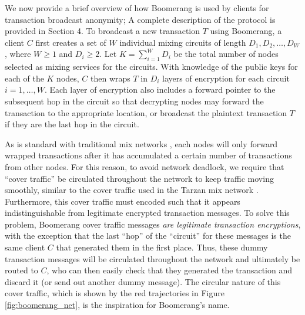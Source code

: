 We now provide a brief overview of how Boomerang is used by clients for transaction broadcast anonymity; A complete description of the protocol is provided in Section 4. To broadcast a new transaction $T$ using Boomerang, a client $C$ first creates a set of $W$ individual mixing circuits of length $D_1,D_2,\dots,D_W$, where $W \geq 1$ and $D_i \geq 2$. Let $K = \sum_{i=1}^WD_i$ be the total number of nodes selected as mixing services for the circuits. With knowledge of the public keys for each of the $K$ nodes, $C$ then wraps $T$ in $D_i$ layers of encryption for each circuit $i = 1,\dots,W$. Each layer of encryption also includes a forward pointer to the subsequent hop in the circuit so that decrypting nodes may forward the transaction to the appropriate location, or broadcast the plaintext transaction $T$ if they are the last hop in the circuit. 

As is standard with traditional mix networks \cite{Chaum81-Mix}, each nodes will only forward wrapped transactions after it has accumulated a certain number of transactions from other nodes. For this reason, to avoid network deadlock, we require that ``cover traffic'' be circulated throughout the network to keep traffic moving smoothly, similar to the cover traffic used in the Tarzan mix network \cite{tarzan}. Furthermore, this cover traffic must encoded such that it appears indistinguishable from legitimate encrypted transaction messages. To solve this problem, Boomerang cover traffic messages \emph{are legitimate transaction encryptions}, with the exception that the last ``hop'' of the ``circuit'' for these messages is the same client $C$ that generated them in the first place. Thus, these dummy transaction messages will be circulated throughout the network and ultimately be routed to $C$, who can then easily check that they generated the transaction and discard it (or send out another dummy message). The circular nature of this cover traffic, which is shown by the red trajectories in Figure \ref{fig:boomerang_net}, is the inspiration for Boomerang's name.

